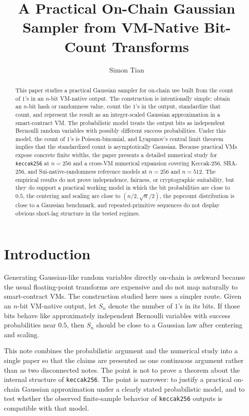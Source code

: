 \documentclass[11pt]{article}
\title{A Practical On-Chain Gaussian Sampler from VM-Native Bit-Count Transforms}
\author{Simon Tian}
\date{}
\begin{document}
\maketitle

\begin{abstract}
This paper studies a practical Gaussian sampler for on-chain use built from the
count of $1$'s in an $n$-bit VM-native output. The construction is intentionally
simple: obtain an $n$-bit hash or randomness value, count the $1$'s in the
output, standardize that count, and represent the result as an integer-scaled
Gaussian approximation in a smart-contract VM. The probabilistic model treats
the output bits as independent Bernoulli random variables with possibly
different success probabilities. Under this model, the count of $1$'s is
Poisson-binomial, and Lyapunov's central limit theorem implies that the
standardized count is asymptotically Gaussian. Because practical VMs expose
concrete finite widths, the paper presents a detailed numerical study for
\texttt{keccak256} at $n=256$ and a cross-VM numerical expansion covering
Keccak-256, SHA-256, and Sui-native-randomness reference models at $n=256$ and
$n=512$. The empirical results do not prove independence, fairness, or
cryptographic suitability, but they do support a practical working model in
which the bit probabilities are close to $0.5$, the centering and scaling are
close to $(n/2, \sqrt{n}/2)$, the popcount distribution is close to a Gaussian
benchmark, and repeated-primitive sequences do not display obvious short-lag
structure in the tested regimes.
\end{abstract}

\section{Introduction}

Generating Gaussian-like random variables directly on-chain is awkward because
the usual floating-point transforms are expensive and do not map naturally to
smart-contract VMs. The construction studied here uses a simpler route. Given
an $n$-bit VM-native output, let $S_n$ denote the number of $1$'s in its bits.
If those bits behave like approximately independent Bernoulli variables with
success probabilities near $0.5$, then $S_n$ should be close to a Gaussian law
after centering and scaling.

This note combines the probabilistic argument and the numerical study into a
single paper so that the claims are presented as one continuous argument rather
than as two disconnected notes. The point is not to prove a theorem about the
internal structure of \texttt{keccak256}. The point is narrower: to justify a
practical on-chain Gaussian approximation under a clearly stated probabilistic
model, and to test whether the observed finite-sample behavior of
\texttt{keccak256} outputs is compatible with that model.
\end{document}
